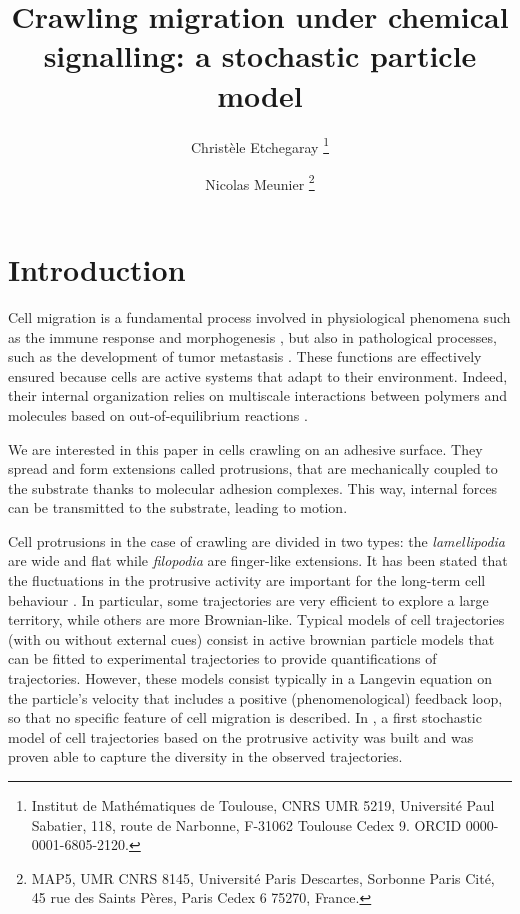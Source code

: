 \documentclass[a4paper,11pt]{article}
\title{Crawling migration under chemical signalling: a stochastic particle model}
\author{Christ\`{e}le Etchegaray \footnote{Institut de Math\'{e}matiques de Toulouse, CNRS UMR 5219, Universit\'{e} Paul Sabatier, 118, route de Narbonne, F-31062 Toulouse Cedex 9. ORCID 0000-0001-6805-2120.}         \and
        Nicolas Meunier \footnote{ MAP5, UMR CNRS 8145, Universit\'{e} Paris Descartes, Sorbonne Paris Cit\'{e}, 45 rue des Saints P\`{e}res, Paris Cedex 6 75270, France.} 
}
\begin{document}
\maketitle

 \section{Introduction}
 
 Cell migration is a fundamental process involved in physiological phenomena such as the immune response and morphogenesis \citep{Anon2012Cell-crawling-m,morphogenesis}, but also in pathological processes, such as the development of tumor metastasis \citep{Friedl2003Tumour-cell-inv}. 
These functions are effectively ensured because cells are active systems that adapt to their environment. Indeed, their internal organization relies on multiscale interactions between polymers and molecules based on out-of-equilibrium reactions \citep{Lauffenburger1996Cell-migration:}. \par 
We are interested in this paper in cells crawling on an adhesive surface. They spread and form extensions called protrusions, that are mechanically coupled to the substrate thanks to molecular adhesion complexes. This way, internal forces can be transmitted to the substrate, leading to motion. 
 \par
Cell protrusions in the case of crawling are divided in two types: the \emph{lamellipodia} are wide and flat while \emph{filopodia} are finger-like extensions. It has been stated that the fluctuations in the protrusive activity are important for the long-term cell behaviour \citep{Caballero2014Protrusion-fluc,Mattila2008Filopodia:-mole,Krause2014Steering-cell-m}. In particular, some trajectories are very efficient to explore a large territory, while others are more Brownian-like. Typical models of cell trajectories (with ou without external cues) consist in active brownian particle models \citep{Stokes1991,Schienbein1993,Romanczuk2012Active-Brownian} that can be fitted to experimental trajectories to provide quantifications of trajectories. However, these models consist typically in a Langevin equation on the particle's velocity that includes a positive (phenomenological) feedback loop, so that no specific feature of cell migration is described. In \citep{etchegaray:tel-01533458}, a first stochastic model of cell trajectories based on the protrusive activity was built and was proven able to capture the diversity in the observed trajectories.
\par 
\end{document}
